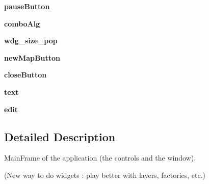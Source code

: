 \begin{DoxyCompactItemize}
\item 
\hypertarget{classsrc_1_1macroevolve_1_1MainFrame_a0bf9416aba449655089181a634ce6050}{
{\bfseries pauseButton}}
\label{classsrc_1_1macroevolve_1_1MainFrame_a0bf9416aba449655089181a634ce6050}

\item 
\hypertarget{classsrc_1_1macroevolve_1_1MainFrame_aad29e0b7a5a4a0700ed054558d92aefa}{
{\bfseries comboAlg}}
\label{classsrc_1_1macroevolve_1_1MainFrame_aad29e0b7a5a4a0700ed054558d92aefa}

\item 
\hypertarget{classsrc_1_1macroevolve_1_1MainFrame_a4cb73a4c14ec170ca5a4807efd406a94}{
{\bfseries wdg\_\-size\_\-pop}}
\label{classsrc_1_1macroevolve_1_1MainFrame_a4cb73a4c14ec170ca5a4807efd406a94}

\item 
\hypertarget{classsrc_1_1macroevolve_1_1MainFrame_a146b889c8c6f7b6a63f89558c110a4fb}{
{\bfseries newMapButton}}
\label{classsrc_1_1macroevolve_1_1MainFrame_a146b889c8c6f7b6a63f89558c110a4fb}

\item 
\hypertarget{classsrc_1_1macroevolve_1_1MainFrame_ab3517a5e0254493abb0b85baf34d4987}{
{\bfseries closeButton}}
\label{classsrc_1_1macroevolve_1_1MainFrame_ab3517a5e0254493abb0b85baf34d4987}

\item 
\hypertarget{classsrc_1_1macroevolve_1_1MainFrame_a96114c1608d9c44b74d29eaea6eb80df}{
{\bfseries text}}
\label{classsrc_1_1macroevolve_1_1MainFrame_a96114c1608d9c44b74d29eaea6eb80df}

\item 
\hypertarget{classsrc_1_1macroevolve_1_1MainFrame_a6e487abe73743e2709d23e14405d543e}{
{\bfseries edit}}
\label{classsrc_1_1macroevolve_1_1MainFrame_a6e487abe73743e2709d23e14405d543e}

\end{DoxyCompactItemize}


\subsection{Detailed Description}
\begin{DoxyVerb}
MainFrame of the application (the controls and the window).

(New way to do widgets : play better with layers, factories, etc.)
\end{DoxyVerb}
 

